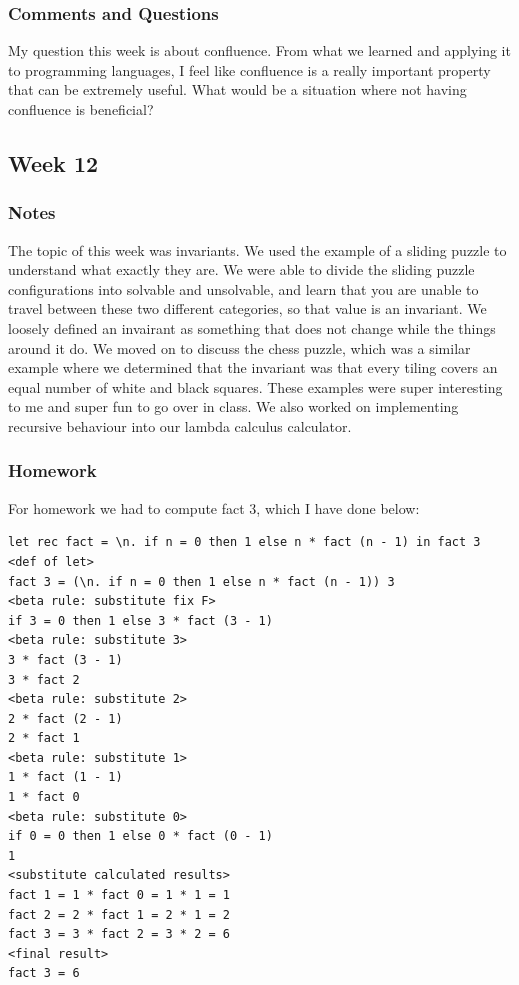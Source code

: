 \documentclass{article}
\theoremstyle{theorem}
\theoremstyle{definition}
\theoremstyle{remark}
\begin{document}
\subsubsection*{Comments and Questions}
My question this week is about confluence. From what we learned and applying it to programming languages,
I feel like confluence is a really important property that can be extremely useful. What would be a situation
where not having confluence is beneficial?
\subsection{Week 12}
\subsubsection*{Notes}
The topic of this week was invariants. We used the example of a sliding puzzle to understand what exactly
they are. We were able to divide the sliding puzzle configurations into solvable and unsolvable, and 
learn that you are unable to travel between these two different categories, so that value is an invariant.
We loosely defined an invairant as something that does not change while the things around it do. We moved
on to discuss the chess puzzle, which was a similar example where we determined that the invariant was that
every tiling covers an equal number of white and black squares. These examples were super interesting to me
and super fun to go over in class. We also worked on implementing recursive behaviour into our lambda 
calculus calculator.
\subsubsection*{Homework}
For homework we had to compute fact 3, which I have done below:

\begin{verbatim}
let rec fact = \n. if n = 0 then 1 else n * fact (n - 1) in fact 3
<def of let>
fact 3 = (\n. if n = 0 then 1 else n * fact (n - 1)) 3
<beta rule: substitute fix F>
if 3 = 0 then 1 else 3 * fact (3 - 1)
<beta rule: substitute 3>
3 * fact (3 - 1)
3 * fact 2
<beta rule: substitute 2>
2 * fact (2 - 1)
2 * fact 1
<beta rule: substitute 1>
1 * fact (1 - 1)
1 * fact 0
<beta rule: substitute 0>
if 0 = 0 then 1 else 0 * fact (0 - 1)
1
<substitute calculated results>
fact 1 = 1 * fact 0 = 1 * 1 = 1
fact 2 = 2 * fact 1 = 2 * 1 = 2
fact 3 = 3 * fact 2 = 3 * 2 = 6
<final result>
fact 3 = 6

\end{verbatim}
\end{document}
